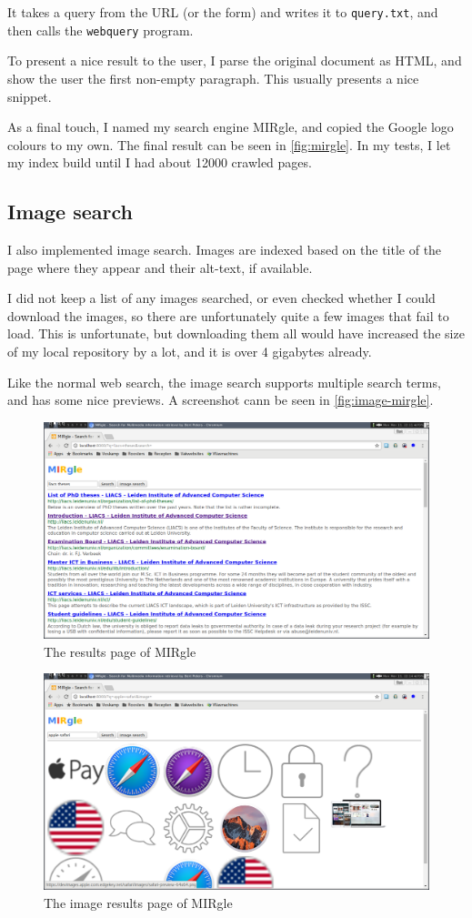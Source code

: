 \documentclass[12pt,a4paper]{article}
\begin{document}
It takes a query from the URL (or the form) and writes it to \texttt{query.txt}, and then calls the \texttt{webquery} program.

To present a nice result to the user, I parse the original document as HTML, and show the user the first non-empty paragraph. This usually presents a nice snippet.

As a final touch, I named my search engine MIRgle, and copied the Google logo colours to my own. The final result can be seen in \autoref{fig:mirgle}. In my tests, I let my index build until I had about 12000 crawled pages.

\subsection{Image search}
I also implemented image search. Images are indexed based on the title of the page where they appear and their alt-text, if available.

I did not keep a list of any images searched, or even checked whether I could download the images, so there are unfortunately quite a few images that fail to load. This is unfortunate, but downloading them all would have increased the size of my local repository by a lot, and it is over 4 gigabytes already.

Like the normal web search, the image search supports multiple search terms, and has some nice previews. A screenshot cann be seen in \autoref{fig:image-mirgle}.

\begin{figure}
\includegraphics[width=\textwidth]{screenshot}
\caption{The results page of MIRgle}
\label{fig:mirgle}
\end{figure}

\begin{figure}
    \includegraphics[width=\textwidth]{screenshot-img}
    \caption{The image results page of MIRgle}
    \label{fig:image-mirgle}
\end{figure}
\end{document}
